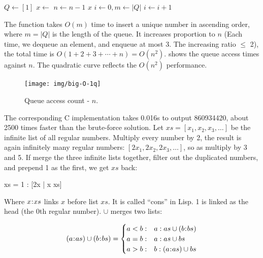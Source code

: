 \documentclass[b5paper]{article}
\begin{document}
\begin{algorithmic}[1]
  \State $Q \gets [1]$
    \State $x \gets$ 
    \State {}
    \State {}
    \State {}
    \State $n \gets n-1$
  \EndWhile
  \State \Return $x$
\EndFunction
\Statex
{}
  \State $i \gets 0, m \gets |Q|$
    \State $i \gets i + 1$
  \EndWhile
    \State {}
  \EndIf
\EndFunction
\end{algorithmic}

The  function takes $O(m)$ time to insert a unique number in ascending order, where $m = |Q|$ is the length of the queue. It increases proportion to $n$ (Each time, we dequeue an element, and enqueue at most 3. The increasing ratio $\leq$ 2), the total time is $O(1 + 2 + 3 + \dotsb + n) = O(n^2)$.  shows the queue access times against $n$. The quadratic curve reflects the $O(n^2)$ performance.

\begin{figure}[htbp]
  \centering
  \texttt{[image: img/big-O-1q]}
  \caption{Queue access count - $n$.}
  \label{fig:big-O-1q}
\end{figure}

The corresponding C implementation takes 0.016s to output 860934420, about 2500 times faster than the brute-force solution. Let $xs = [x_1, x_2, x_3, \dotsc]$ be the infinite list of all regular numbers. Multiply every number by 2, the result is again infinitely many regular numbers: $[2x_1, 2x_2, 2x_3, \dotsc]$, so as multiply by 3 and 5. If merge the three infinite lists together, filter out the duplicated numbers, and prepend 1 as the first, we get $xs$ back:

\be
  xs = 1 : [2x | x \gets xs] \cup [3x | x \gets xs] \cup [5x | x \gets xs]
\ee

Where $x \mathbin{\!:\!} xs$ links $x$ before list $xs$. It is called \enquote{cons} in Lisp. 1 is linked as the head (the 0th regular number). $\cup$ merges two lists:

\[
(a \cons as) \cup (b \cons bs) = \begin{cases}
  a < b: & a : as \cup (b \cons bs) \\
  a = b: & a : as \cup bs \\
  a > b: & b : (a \cons as) \cup bs
\end{cases}
\]
\end{document}

